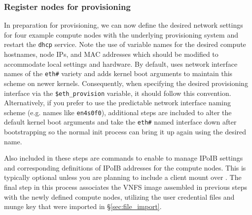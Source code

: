 \subsubsection{Register nodes for provisioning}

In preparation for provisioning, we can now define the desired network settings
for four example compute nodes with the underlying provisioning system and
restart the \texttt{dhcp} service. Note the use of variable names for the
desired compute hostnames, node IPs, and MAC addresses which should be modified
to accommodate local settings and hardware.  By default, \Warewulf{} uses
network interface names of the \texttt{eth\#} variety and adds kernel boot
arguments to maintain this scheme on newer kernels. Consequently, when specifying
the desired provisioning interface via the \texttt{\$eth\_provision} variable,
it should follow this convention. Alternatively, if you prefer to use the
predictable network interface naming scheme (e.g. names like \texttt{en4s0f0}),
additional steps are included to alter the default kernel boot arguments and take
the \texttt{eth\#} named interface down after bootstrapping so the normal init
process can bring it up again using the desired name.

Also included in these steps are commands
to enable \Warewulf{} to manage IPoIB settings and corresponding definitions of
IPoIB addresses for the compute nodes. This is typically optional unless you
are planning to include a \Lustre{} client mount over \InfiniBand{}.
\fi
The final step
in this process associates the VNFS image assembled in previous steps with the
newly defined compute nodes, utilizing the user credential files and munge key
that were imported in \S\ref{sec:file_import}.


